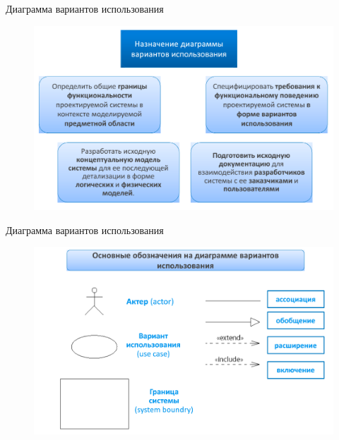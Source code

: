 \documentclass{beamer}
\begin{document}
\begin{frame}[t]{Диаграмма вариантов использования}
\begin{figure}[h]
\centering
\includegraphics[scale=0.45]{images/lec03-pic08.png}
\end{figure}
\end{frame}

\begin{frame}[t]{Диаграмма вариантов использования}
\begin{figure}[h]
\centering
\includegraphics[scale=0.45]{images/lec03-pic09.png}
\end{figure}
\end{frame}
\end{document}
